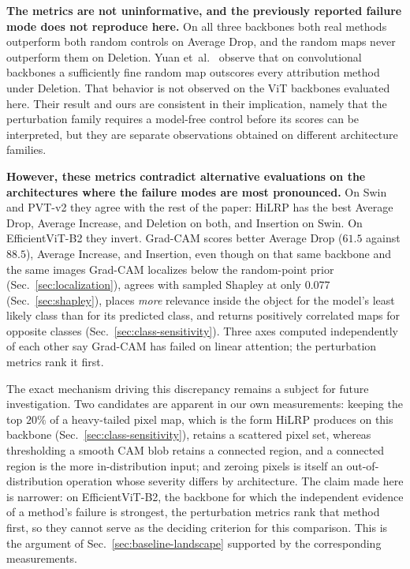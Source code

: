\documentclass[lettersize,journal]{IEEEtran}
\theoremstyle{definition}
\theoremstyle{plain}
\begin{document}
\textbf{The metrics are not uninformative, and the previously reported failure
mode does not reproduce here.} On all three backbones both real methods
outperform both random controls on Average Drop, and the random maps never
outperform them on Deletion. Yuan et~al.~\cite{yuan2025fourchar} observe that on convolutional backbones a
sufficiently fine random map outscores every attribution method under Deletion.
That behavior is not observed on the ViT backbones evaluated here. Their result
and ours are consistent in their implication, namely that the perturbation
family requires a model-free control before its scores can be interpreted, but
they are separate observations obtained on different architecture families.

\textbf{However, these metrics contradict alternative evaluations on the
architectures where the failure modes are most pronounced.} On Swin and PVT-v2
they agree with the rest of the paper:
HiLRP has the best Average Drop, Average Increase, and Deletion on both, and
Insertion on Swin. On EfficientViT-B2 they invert. Grad-CAM scores better
Average Drop ($61.5$ against $88.5$), Average Increase, and Insertion, even
though on that same backbone and the same images Grad-CAM localizes below the
random-point prior (Sec.~\ref{sec:localization}), agrees with sampled Shapley at
only $0.077$ (Sec.~\ref{sec:shapley}), places \emph{more} relevance inside the
object for the model's least likely class than for its predicted class, and
returns positively correlated maps for opposite classes
(Sec.~\ref{sec:class-sensitivity}). Three axes computed independently of each
other say Grad-CAM has failed on linear attention; the perturbation metrics rank
it first.

The exact mechanism driving this discrepancy remains a subject for future investigation. Two candidates are apparent in our own measurements: keeping the top $20\%$ of a heavy-tailed pixel map, which
is the form HiLRP produces on this backbone (Sec.~\ref{sec:class-sensitivity}),
retains a scattered pixel set, whereas thresholding a smooth CAM blob retains a
connected region, and a connected region is the more in-distribution input;
and zeroing pixels is itself an out-of-distribution operation whose severity
differs by architecture. The claim made here is narrower: on EfficientViT-B2, the backbone for which the
independent evidence of a method's failure is strongest, the perturbation
metrics rank that method first, so they cannot serve as the deciding criterion
for this comparison. This is the argument of Sec.~\ref{sec:baseline-landscape}
supported by the corresponding measurements.
\end{document}
